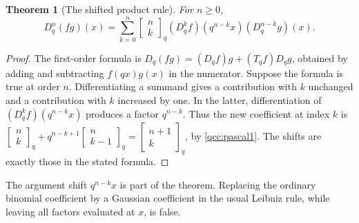 \documentclass[11pt,a4paper,oneside,openany]{book}
\newtheorem{theorem}{Theorem}[chapter]
\theoremstyle{definition}
\theoremstyle{remark}
\newcommand{\GB}[3][q]{\begin{bmatrix}#2\\#3\end{bmatrix}_{#1}}
\begin{document}
\begin{theorem}[The shifted product rule]\label{qcc:leibniz}
For \(n\ge0\),
\begin{equation}\label{qcc:q-leibniz}
 D_q^n(fg)(x)=\sum_{k=0}^n\GB nk
 (D_q^k f)(q^{n-k}x)(D_q^{n-k}g)(x).
\end{equation}
\end{theorem}
\begin{proof}
The first-order formula is
\(D_q(fg)=(D_qf)g+(T_qf)D_qg\), obtained by adding and subtracting
\(f(qx)g(x)\) in the numerator. Suppose the formula is true at order \(n\).
Differentiating a summand gives a contribution with \(k\) unchanged and a
contribution with \(k\) increased by one. In the latter, differentiation of
\((D_q^kf)(q^{n-k}x)\) produces a factor \(q^{n-k}\).
Thus the new coefficient at index \(k\) is
\(\GB nk+q^{n-k+1}\GB n{k-1}=\GB{n+1}k\), by
\eqref{qcc:pascal1}. The shifts are exactly those in the stated formula.
\end{proof}
\begin{auditbox}
The argument shift \(q^{n-k}x\) is part of the theorem. Replacing the ordinary
binomial coefficient by a Gaussian coefficient in the usual Leibniz rule, while
leaving all factors evaluated at \(x\), is false.
\end{auditbox}
\end{document}
